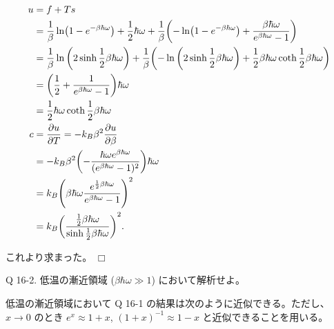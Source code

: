 \documentclass[uplatex,dvipdfmx,a4paper,11pt]{jlreq}
\theoremstyle{definition}
\begin{document}
\begin{align}
  u & = f + Ts                                                                                                                                                                                      \\
    & = \frac{1}{\beta}\ln(1 - e^{-\beta\hbar\omega}) + \frac{1}{2}\hbar\omega + \frac{1}{\beta}\qty(-\ln(1 - e^{-\beta\hbar\omega}) + \frac{\beta\hbar\omega}{e^{\beta\hbar\omega} - 1})           \\
    & = \frac{1}{\beta}\ln\qty(2\sinh \frac{1}{2}\beta\hbar\omega) + \frac{1}{\beta}\qty(-\ln\qty(2\sinh\frac{1}{2}\beta\hbar\omega) + \frac{1}{2}\beta\hbar\omega\coth\frac{1}{2}\beta\hbar\omega) \\
    & = \qty(\frac{1}{2} + \frac{1}{e^{\beta\hbar\omega} - 1})\hbar\omega                                                                                                                           \\
    & = \frac{1}{2}\hbar\omega\coth\frac{1}{2}\beta\hbar\omega                                                                                                                                      \\
  c & = \pdv{u}{T} = -k_B\beta^2\pdv{u}{\beta}                                                                                                                                                      \\
    & = -k_B\beta^2\qty(-\frac{\hbar\omega e^{\beta\hbar\omega}}{(e^{\beta\hbar\omega} - 1)^2})\hbar\omega                                                                                          \\
    & = k_B\qty(\beta\hbar\omega\frac{e^{\frac{1}{2}\beta\hbar\omega}}{e^{\beta\hbar\omega} - 1})^2                                                                                                 \\
    & = k_B\qty(\frac{\frac{1}{2}\beta\hbar\omega}{\sinh\frac{1}{2}\beta\hbar\omega})^2.
\end{align}

これより求まった。 $\Box$

\begin{itembox}[l]{Q 16-2.}
  低温の漸近領域 ($\beta\hbar\omega \gg 1$) において解析せよ。
\end{itembox}

低温の漸近領域において Q 16-1 の結果は次のように近似できる。ただし、$x\to 0$ のとき $e^x \approx 1 + x$, $(1 + x)^{-1} \approx 1 - x$ と近似できることを用いる。
\end{document}
